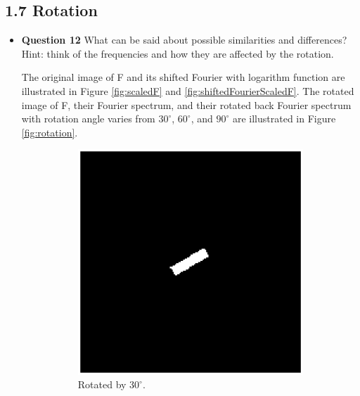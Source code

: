 \documentclass[11pt,a4paper]{article}
\begin{document}
\subsection*{1.7 Rotation}
\begin{itemize}
	\item \textbf{Question 12} What can be said about possible similarities and differences? Hint: think of the frequencies and how they are affected by the rotation.
	\par The original image of F and its shifted Fourier with logarithm function are illustrated in Figure \ref{fig:scaledF} and \ref{fig:shiftedFourierScaledF}. The rotated image of F, their Fourier spectrum, and their rotated back Fourier spectrum with rotation angle varies from $30^{\circ}$, $60^{\circ}$, and $90^{\circ}$ are illustrated in Figure \ref{fig:rotation}.
	\begin{figure}[!ht]
		\footnotesize
		\centering 
		\begin{subfigure}[t]{.32\linewidth} %
		\includegraphics[width=\columnwidth]{Rotation_G_30.eps}
		\caption{\scriptsize Rotated by $30^{\circ}$.}
		\label{fig:rotated30}
		\end{subfigure}
		\begin{subfigure}[t]{.32\linewidth} %

\end{subfigure}
\end{figure}
\end{itemize}
\end{document}
